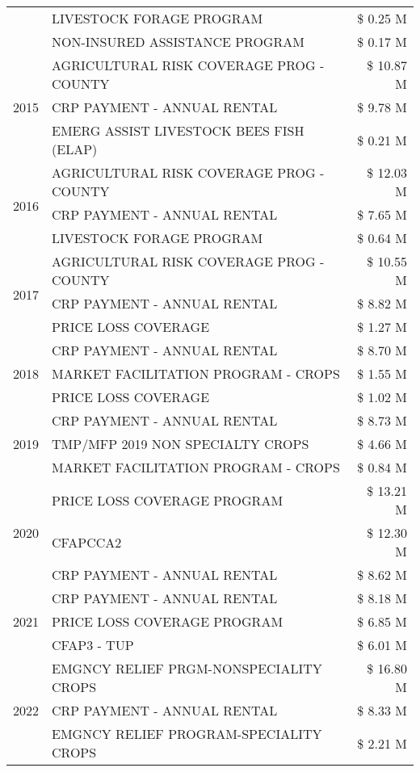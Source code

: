 \begin{tabular}{llr}
 & LIVESTOCK FORAGE PROGRAM & \$ 0.25 M \\
 & NON-INSURED ASSISTANCE PROGRAM & \$ 0.17 M \\
\cline{1-3}
\multirow[t]{3}{*}{2015} & AGRICULTURAL RISK COVERAGE PROG - COUNTY & \$ 10.87 M \\
 & CRP PAYMENT - ANNUAL RENTAL & \$ 9.78 M \\
 & EMERG ASSIST LIVESTOCK BEES FISH (ELAP) & \$ 0.21 M \\
\cline{1-3}
\multirow[t]{3}{*}{2016} & AGRICULTURAL RISK COVERAGE PROG - COUNTY & \$ 12.03 M \\
 & CRP PAYMENT - ANNUAL RENTAL & \$ 7.65 M \\
 & LIVESTOCK FORAGE PROGRAM & \$ 0.64 M \\
\cline{1-3}
\multirow[t]{3}{*}{2017} & AGRICULTURAL RISK COVERAGE PROG - COUNTY & \$ 10.55 M \\
 & CRP PAYMENT - ANNUAL RENTAL & \$ 8.82 M \\
 & PRICE LOSS COVERAGE & \$ 1.27 M \\
\cline{1-3}
\multirow[t]{3}{*}{2018} & CRP PAYMENT - ANNUAL RENTAL & \$ 8.70 M \\
 & MARKET FACILITATION PROGRAM - CROPS & \$ 1.55 M \\
 & PRICE LOSS COVERAGE & \$ 1.02 M \\
\cline{1-3}
\multirow[t]{3}{*}{2019} & CRP PAYMENT - ANNUAL RENTAL & \$ 8.73 M \\
 & TMP/MFP 2019 NON SPECIALTY CROPS & \$ 4.66 M \\
 & MARKET FACILITATION PROGRAM - CROPS & \$ 0.84 M \\
\cline{1-3}
\multirow[t]{3}{*}{2020} & PRICE LOSS COVERAGE PROGRAM & \$ 13.21 M \\
 & CFAPCCA2 & \$ 12.30 M \\
 & CRP PAYMENT - ANNUAL RENTAL & \$ 8.62 M \\
\cline{1-3}
\multirow[t]{3}{*}{2021} & CRP PAYMENT - ANNUAL RENTAL & \$ 8.18 M \\
 & PRICE LOSS COVERAGE PROGRAM & \$ 6.85 M \\
 & CFAP3 - TUP & \$ 6.01 M \\
\cline{1-3}
\multirow[t]{3}{*}{2022} & EMGNCY RELIEF PRGM-NONSPECIALITY CROPS & \$ 16.80 M \\
 & CRP PAYMENT - ANNUAL RENTAL & \$ 8.33 M \\
 & EMGNCY RELIEF PROGRAM-SPECIALITY CROPS & \$ 2.21 M \\
\cline{1-3}
\bottomrule
\end{tabular}
